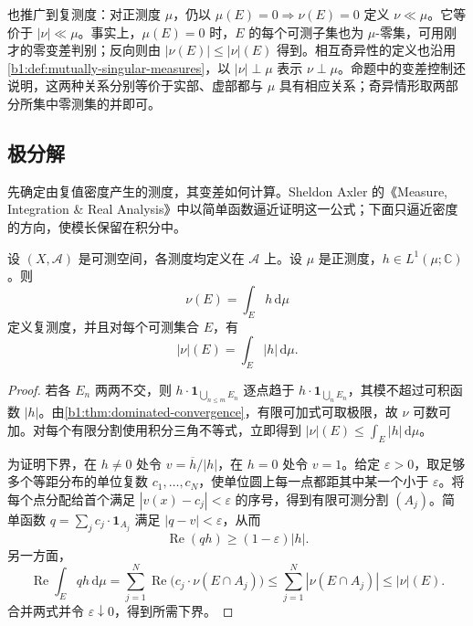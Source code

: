 \ProseParagraphBreak

也推广到复测度：对正测度 \(\mu\)，仍以 \(\mu(E)=0\Rightarrow\nu(E)=0\) 定义 \(\nu\ll\mu\)。它等价于 \(|\nu|\ll\mu\)。事实上，\(\mu(E)=0\) 时，\(E\) 的每个可测子集也为 \(\mu\)-零集，可用刚才的零变差判别；反向则由 \(|\nu(E)|\leq|\nu|(E)\) 得到。相互奇异性的定义也沿用\cref{b1:def:mutually-singular-measures}，以 \(|\nu|\perp\mu\) 表示 \(\nu\perp\mu\)。命题中的变差控制还说明，这两种关系分别等价于实部、虚部都与 \(\mu\) 具有相应关系；奇异情形取两部分所集中零测集的并即可。

\subsection{极分解}
\label{b1:subsec:060503}

先确定由复值密度产生的测度，其变差如何计算。Sheldon Axler 的《Measure, Integration \& Real Analysis》\cite[Chapter 9]{Axler2020Measure}中以简单函数逼近证明这一公式；下面只逼近密度的方向，使模长保留在积分中。

\begin{lemma}\label{b1:lem:complex-density-variation}
设 \((X,\mathcal A)\) 是可测空间，各测度均定义在 \(\mathcal A\) 上。设 \(\mu\) 是正测度，\(h\in L^1(\mu;\mathbb C)\)。则
\[
\nu(E)=\int_Eh\,\mathrm d\mu
\]
定义复测度，并且对每个可测集合 \(E\)，有
\[
|\nu|(E)=\int_E|h|\,\mathrm d\mu.
\]
\end{lemma}
\begin{proof}
若各 \(E_n\) 两两不交，则 \(h\cdot\mathbf1_{\bigcup_{n\leq m}E_n}\) 逐点趋于 \(h\cdot\mathbf1_{\bigcup_nE_n}\)，其模不超过可积函数 \(|h|\)。由\cref{b1:thm:dominated-convergence}，有限可加式可取极限，故 \(\nu\) 可数可加。对每个有限分割使用积分三角不等式，立即得到 \(|\nu|(E)\leq\int_E|h|\,\mathrm d\mu\)。

为证明下界，在 \(h\neq0\) 处令 \(v=\overline h/|h|\)，在 \(h=0\) 处令 \(v=1\)。给定 \(\varepsilon>0\)，取足够多个等距分布的单位复数 \(c_1,\ldots,c_N\)，使单位圆上每一点都距其中某一个小于 \(\varepsilon\)。将每个点分配给首个满足 \(|v(x)-c_j|<\varepsilon\) 的序号，得到有限可测分割 \((A_j)\)。简单函数 \(q=\sum_jc_j\cdot\mathbf1_{A_j}\) 满足 \(|q-v|<\varepsilon\)，从而
\[
\operatorname{Re}(qh)\geq(1-\varepsilon)|h|.
\]
另一方面，
\[
\operatorname{Re}\int_Eqh\,\mathrm d\mu
=\sum_{j=1}^{N}\operatorname{Re}\bigl(c_j\cdot\nu(E\cap A_j)\bigr)
\leq\sum_{j=1}^{N}|\nu(E\cap A_j)|
\leq|\nu|(E).
\]
合并两式并令 \(\varepsilon\downarrow0\)，得到所需下界。
\end{proof}

